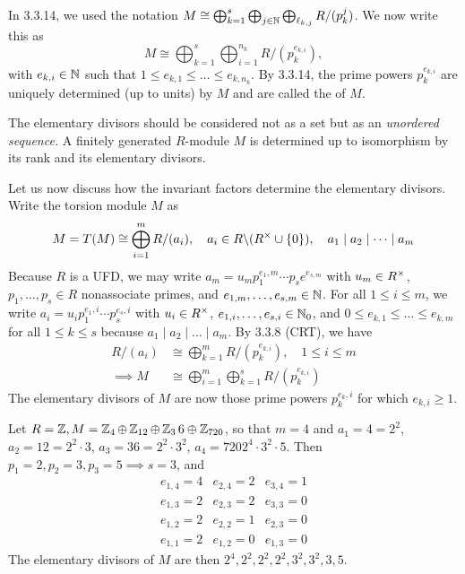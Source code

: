 \documentclass[11pt]{book}
\theoremstyle{definition}   \newtheorem{defn}[counter]{Definition} %
\newcommand{\bs}{\backslash}   \newcommand{\A}{\mathcal{A}}   \newcommand{\sy}{\textnormal{Syl}}   \newcommand{\size}[1]{\left| #1 \right|}
\newcommand{\vs}{\vspace{8pt}}
\numberwithin{counter}{chapter}
\begin{document}
\vs

In 3.3.14, we used the notation $M \cong \bigoplus_{k=1}^s \bigoplus_{j \in \operatorname{\mathbb{N}}} \bigoplus_{\ell_{k,j}} R/(p_k^j)$. We now write this as
	\[M \cong \bigoplus_{k=1}^s \bigoplus_{i=1}^{n_k} R/(p_k^{e_{k,i}}), \]
with $e_{k,i} \in \operatorname{\mathbb{N}}$ such that $1 \leq e_{k,1} \leq \dots \leq e_{k,n_k}$. By 3.3.14, the prime powers $p_k^{e_{k,i}}$ are uniquely determined (up to units) by $M$ and are called the  of $M$.

\vs

\begin{remark}[+ Discussion]
The elementary divisors should be considered not as a set but as an \emph{unordered sequence.} A finitely generated $R$-module $M$ is determined up to isomorphism by its rank and its elementary divisors.

Let us now discuss how the invariant factors determine the elementary divisors. Write the torsion module $M$ as
	\[M = T(M) \cong \bigoplus_{i=1}^m R/(a_i), \quad a_i \in R\bs(R\x \cup \{0\}), \quad a_1 \mid a_2 \mid \dots \mid a_m \]
Because $R$ is a UFD, we may write $a_m = u_m p_1^{e_1,m} \cdots p_s e^{e_{s,m}}$ with $u_m \in R^{\times}$, $p_1,\dots,p_s \in R$ nonassociate primes, and $e_{1,m},\dots,e_{s,m} \in \operatorname{\mathbb{N}}$. For all $1 \leq i \leq m$, we write $a_i = u_i p_1 ^{e_1,i} \cdots p_s ^{e_s,i}$ with $u_i \in R^{\times}$, $e_{1,i},\dots,e_{s,i} \in \operatorname{\mathbb{N}}_0$, and $0 \leq e_{k,1} \leq \dots \leq e_{k,m}$ for all $1 \leq k \leq s$ because $a_1 \mid a_2 \mid \dots \mid a_m$. By 3.3.8 (CRT), we have
\begin{align*}
R/(a_i) &\cong \bigoplus_{k=1}^m R/(p_k^{e_{k,i}}), \quad 1 \leq i \leq m \\
\implies M &\cong \bigoplus_{i=1}^m \bigoplus_{k=1}^s R/(p_k^{e_{k,i}})
\end{align*}
The elementary divisors of $M$ are now those prime powers $p_k^{e_k,i}$ for which $e_{k,i} \geq 1$.

\vs

\begin{example*}
Let $R = \operatorname{\mathbb{Z}}, M = \operatorname{\mathbb{Z}}_4 \oplus \operatorname{\mathbb{Z}}_{12} \oplus \operatorname{\mathbb{Z}}_36 \oplus \operatorname{\mathbb{Z}}_{720}$, so that $m = 4$ and $a_1 = 4 = 2^2$, $a_2 = 12 = 2^2 \cdot 3$, $a_3 = 36 = 2^2 \cdot 3^2$, $a_4 = 720 2^4 \cdot 3^2 \cdot 5$. Then $p_1 = 2, p_2 = 3, p_3 = 5 \implies s=3$, and
\[\begin{array}{rrr}
e_{1,4} = 4 & e_{2,4} = 2 & e_{3,4} = 1 \\
e_{1,3} = 2 & e_{2,3} = 2 & e_{3,3} = 0 \\
e_{1,2} = 2 & e_{2,2} = 1 & e_{2,3} = 0 \\
e_{1,1} = 2 & e_{1,2} = 0 & e_{1,3} = 0
\end{array} \]
The elementary divisors of $M$ are then $2^4,2^2,2^2,2^2,3^2,3^2,3,5$.
\end{example*}


\end{remark}
\end{document}
